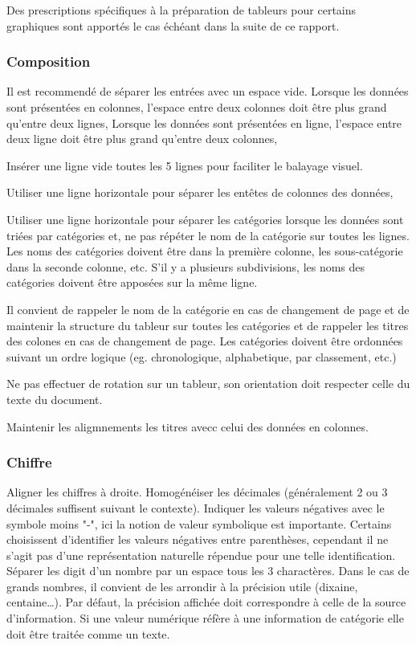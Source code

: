 \documentclass[a4paper,12pt]{article}
\begin{document}
\begin{multicols}{2}
Des prescriptions spécifiques à la préparation de tableurs pour certains graphiques sont apportés le cas échéant dans la suite de ce rapport.
\subsubsection*{Composition}
\label{sec:org248d016}
Il est recommendé de séparer les entrées avec un espace vide.
Lorsque les données sont présentées en colonnes, l'espace entre deux colonnes doit être plus grand qu'entre deux lignes,
Lorsque les données sont présentées en ligne, l'espace entre deux ligne doit être plus grand qu'entre deux colonnes,

Insérer une ligne vide toutes les 5 lignes pour faciliter le balayage visuel. \autocite{NFENISO9241-125ErgonomieLinteractionHommesysteme2017}

Utiliser une ligne horizontale pour séparer les entêtes de colonnes des données,

Utiliser une ligne horizontale pour séparer les catégories lorsque les données sont triées par catégories et, ne pas répéter le nom de la catégorie sur toutes les lignes. Les noms des catégories doivent être dans la première colonne, les sous-catégorie dans la seconde colonne, etc. S'il y a plusieurs subdivisions, les noms des catégories doivent être apposées sur la même ligne.

Il convient de rappeler le nom de la catégorie en cas de changement de page et de maintenir la structure du tableur sur toutes les catégories et de rappeler les titres des colones en cas de changement de page.
Les catégories doivent être ordonnées suivant un ordre logique (eg. chronologique, alphabetique, par classement, etc.)

Ne pas effectuer de rotation sur un tableur, son orientation doit respecter celle du texte du document.

Maintenir les aligmnements les titres avecc celui des données en colonnes.
\subsubsection*{Chiffre}
\label{sec:orge10af93}
Aligner les chiffres à droite.
Homogénéiser les décimales (généralement 2 ou 3 décimales suffisent suivant le contexte).
Indiquer les valeurs négatives avec le symbole moins "-", ici la notion de valeur symbolique est importante. Certains choisissent d'identifier les valeurs négatives entre parenthèses, cependant il ne s'agit pas d'une représentation naturelle répendue pour une telle identification.
Séparer les digit d'un nombre par un espace tous les 3 charactères. Dans le cas de grands nombres, il convient de les arrondir à la précision utile (dixaine, centaine\ldots{}). Par défaut, la précision affichée doit correspondre à celle de la source d'information.
Si une valeur numérique réfère à une information de catégorie elle doit être traitée comme un texte.


\end{multicols}
\end{document}
